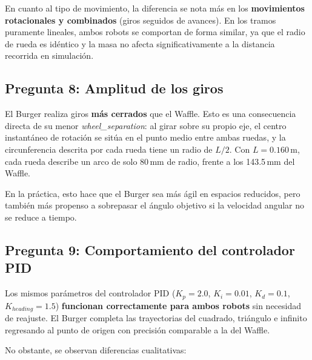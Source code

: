 En cuanto al tipo de movimiento, la diferencia se nota más en los \textbf{movimientos rotacionales y combinados} (giros seguidos de avances). En los tramos puramente lineales, ambos robots se comportan de forma similar, ya que el radio de rueda es idéntico y la masa no afecta significativamente a la distancia recorrida en simulación.

\subsection*{Pregunta 8: Amplitud de los giros}

El Burger realiza giros \textbf{más cerrados} que el Waffle. Esto es una consecuencia directa de su menor \textit{wheel\_separation}: al girar sobre su propio eje, el centro instantáneo de rotación se sitúa en el punto medio entre ambas ruedas, y la circunferencia descrita por cada rueda tiene un radio de $L/2$. Con $L = 0.160\,\text{m}$, cada rueda describe un arco de solo 80\,mm de radio, frente a los 143.5\,mm del Waffle.

En la práctica, esto hace que el Burger sea más ágil en espacios reducidos, pero también más propenso a sobrepasar el ángulo objetivo si la velocidad angular no se reduce a tiempo.

\subsection*{Pregunta 9: Comportamiento del controlador PID}

Los mismos parámetros del controlador PID ($K_p = 2.0$, $K_i = 0.01$, $K_d = 0.1$, $K_{heading} = 1.5$) \textbf{funcionan correctamente para ambos robots} sin necesidad de reajuste. El Burger completa las trayectorias del cuadrado, triángulo e infinito regresando al punto de origen con precisión comparable a la del Waffle.

No obstante, se observan diferencias cualitativas:

